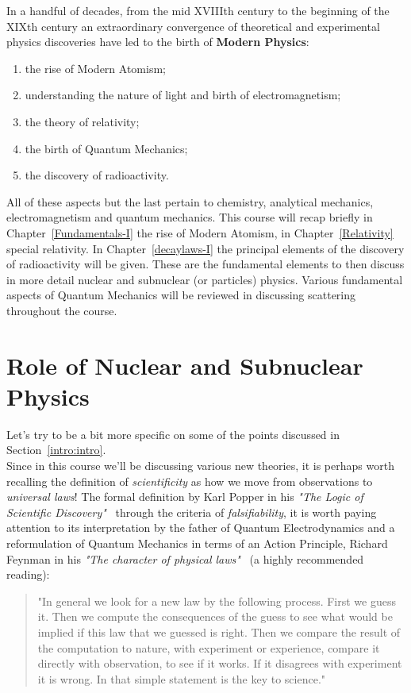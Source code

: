 In a handful of decades, from the mid XVIIIth century to the beginning of the XIXth century an extraordinary convergence of theoretical and experimental physics discoveries have led to the birth of {\bf Modern Physics}:
\begin{enumerate}
\item the rise of Modern Atomism;
\item understanding the nature of light and birth of electromagnetism;
\item the theory of relativity;
\item the birth of Quantum Mechanics;
\item the discovery of radioactivity.
\end{enumerate}

All of these aspects but the last pertain to chemistry, analytical mechanics, electromagnetism and  quantum mechanics. This course will recap briefly in Chapter~\ref{Fundamentals-I} the rise of Modern Atomism, in Chapter~\ref{Relativity} special relativity. In Chapter~\ref{decaylaws-I} the principal elements of the discovery of radioactivity will be given. These are the fundamental elements to then discuss in more detail nuclear and subnuclear (or particles) physics. Various fundamental aspects of Quantum Mechanics will be reviewed in discussing scattering throughout the course.

    
\section{Role of Nuclear and Subnuclear Physics}    

Let's try to be a bit more specific on some of the points discussed in Section~\ref{intro:intro}. \\

Since in this course we'll be discussing various new theories, it is perhaps worth recalling the definition of {\it scientificity} as how we move from observations to {\it universal laws}! The formal definition by Karl Popper in his {\it "The Logic of Scientific Discovery"}~\cite{Popper:Scientificity} through the criteria of {\it falsifiability}, it is worth paying attention to its interpretation by the father of Quantum Electrodynamics and a reformulation of Quantum Mechanics in terms of an Action Principle, Richard Feynman in his {\it "The character of physical laws"}~\cite{Feynman:PhysicalLaws} (a highly recommended reading):

\begin{quote}
"In general we look for a new law by the following process. First we guess it. Then we compute the consequences of the guess to see what would be implied if this law that we guessed is right. Then we compare the result of the computation to nature, with experiment or experience, compare it directly with observation, to see if it works. If it disagrees with experiment it is wrong. In that simple statement is the key to science."
\end{quote}

